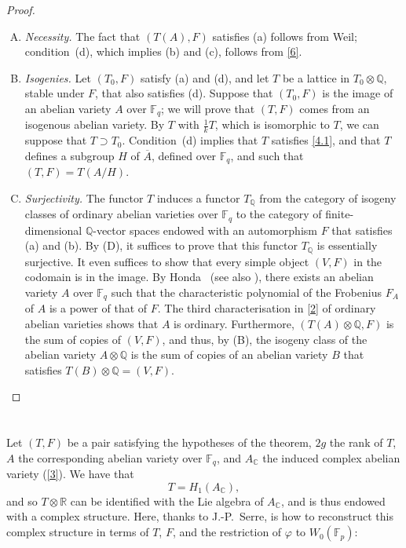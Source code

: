 \documentclass{article}
\newcommand{\FF}{\mathbb{F}}
\newcommand{\QQ}{\mathbb{Q}}
\newcommand{\RR}{\mathbb{R}}
\newcommand{\CC}{\mathbb{C}}
\newcommand{\oldpage}[1]{\marginpar{\footnotesize$\Big\vert$ \textit{p.~#1}}}
\begin{document}
\begin{proof}
\begin{enumerate}[(A)]
    \item \emph{Necessity.}
      The fact that $(T(A),F)$ satisfies (a) follows from Weil;
        condition~(d), which implies (b) and (c), follows from \cref{6}.
\oldpage{242}
    \item \emph{Isogenies.}
      Let $(T_0,F)$ satisfy (a) and (d), and let $T$ be a lattice in $T_0\otimes\QQ$, stable under $F$, that also satisfies (d).
      Suppose that $(T_0,F)$ is the image of an abelian variety $A$ over $\FF_q$; we will prove that $(T,F)$ comes from an isogenous abelian variety.
      By $T$ with $\frac1k T$, which is isomorphic to $T$, we can suppose that $T\supset T_0$.
      Condition~(d) implies that $T$ satisfies \cref{4.1}, and that $T$ defines a subgroup $H$ of $\overline{A}$, defined over $\FF_q$, and such that $(T,F)=T(A/H)$.
    \item \emph{Surjectivity.}
      The functor $T$ induces a functor $T_\QQ$ from the category of isogeny classes of ordinary abelian varieties over $\FF_q$ to the category of finite-dimensional $\QQ$-vector spaces endowed with an automorphism $F$ that satisfies (a) and (b).
      By (D), it suffices to prove that this functor $T_\QQ$ is essentially surjective.
      It even suffices to show that every simple object $(V,F)$ in the codomain is in the image.
      By Honda~\cite{1} (see also \cite{6}), there exists an abelian variety $A$ over $\FF_q$ such that the characteristic polynomial of the Frobenius $F_A$ of $A$ is a power of that of $F$.
      The third characterisation in \cref{2} of ordinary abelian varieties shows that $A$ is ordinary.
      Furthermore, $(T(A)\otimes\QQ,F)$ is the sum of copies of $(V,F)$, and thus, by (B), the isogeny class of the abelian variety $A\otimes\QQ$ is the sum of copies of an abelian variety $B$ that satisfies $T(B)\otimes\QQ=(V,F)$.
  \end{enumerate}
\end{proof}


\section{}
\label{8}
Let $(T,F)$ be a pair satisfying the hypotheses of the theorem, $2g$ the rank of $T$, $A$ the corresponding abelian variety over $\FF_q$, and $A_\CC$ the induced complex abelian variety (\cref{3}).
We have that
\[
  T= H_1(A_\CC),
\]
and so $T\otimes\RR$ can be identified with the Lie algebra of $A_\CC$, and is thus endowed with a complex structure.
Here, thanks to J.-P.~Serre, is how to reconstruct this complex structure in terms of $T$, $F$, and the restriction of $\varphi$ to $W_0(\FF_p)$:
\end{document}
